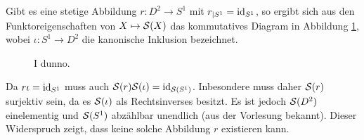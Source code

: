 \documentclass[a4paper,10pt]{article}
\begin{document}
Gibt es eine stetige Abbildung $r : D^2 \to S^1$ mit $r_{|S^1} = \operatorname{id}_{S^1}$, so ergibt sich aus den Funktoreigenschaften von $X \mapsto \mathcal{S}(X)$ das kommutatives Diagram in Abbildung \ref{fig: SX Funktor}, wobei $\iota : S^1 \to D^2$ die kanonische Inklusion bezeichnet.
\begin{figure}\centering
 \caption{I dunno.}
 \label{fig: SX Funktor}
\end{figure}

Da $r \iota = \operatorname{id}_{S^1}$ muss auch $\mathcal{S}(r) \mathcal{S}(\iota) = \operatorname{id}_{\mathcal{S}\left(S^1\right)}$. Inbesondere muss daher $\mathcal{S}(r)$ surjektiv sein, da es $\mathcal{S}(\iota)$ als Rechtsinverses besitzt. Es ist jedoch $\mathcal{S}(D^2)$ einelementig und $\mathcal{S}(S^1)$ abzählbar unendlich (aus der Vorlesung bekannt). Dieser Widerspruch zeigt, dass keine solche Abbildung $r$ existieren kann.
\end{document}
